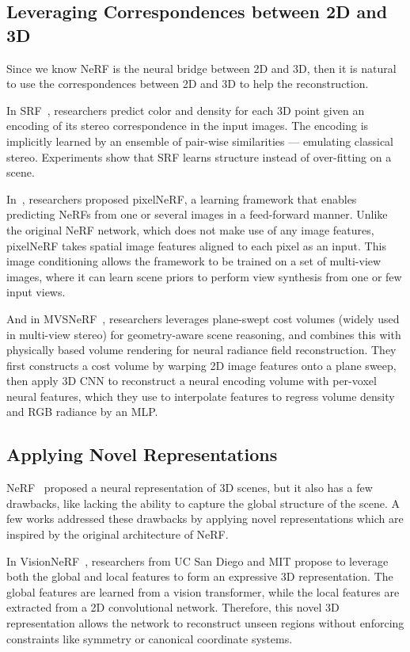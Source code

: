 \documentclass[10pt,twocolumn,letterpaper]{article}
\begin{document}
\subsection{Leveraging Correspondences between 2D and 3D}

Since we know NeRF is the neural bridge between 2D and 3D, then it is natural to use the correspondences between 2D and 3D to help the reconstruction.

In SRF~\cite{SRF}, researchers predict color and density for each 3D point given an encoding of its stereo correspondence in the input images. The encoding is implicitly learned by an ensemble of pair-wise similarities — emulating classical stereo. Experiments show that SRF learns structure instead of over-fitting on a scene.

In~\cite{yu2020pixelnerf}, researchers proposed pixelNeRF, a learning framework that enables predicting NeRFs from one or several images in a feed-forward manner. Unlike the original NeRF network, which does not make use of any image features, pixelNeRF takes spatial image features aligned to each pixel as an input. This image conditioning allows the framework to be trained on a set of multi-view images, where it can learn scene priors to perform view synthesis from one or few input views.

And in MVSNeRF~\cite{mvsnerf}, researchers leverages plane-swept cost volumes (widely used in multi-view stereo) for geometry-aware scene reasoning, and combines this with physically based volume rendering for neural radiance field reconstruction.
They first constructs a cost volume by warping 2D image features onto a plane sweep, then apply 3D CNN to reconstruct a neural encoding volume with per-voxel neural features, which they use to interpolate features to regress volume density and RGB radiance by an MLP.

\subsection{Applying Novel Representations}

NeRF~\cite{mildenhall2020nerf} proposed a neural representation of 3D scenes, but it also has a few drawbacks, like lacking the ability to capture the global structure of the scene. A few works addressed these drawbacks by applying novel representations which are inspired by the original architecture of NeRF.

In VisionNeRF~\cite{lin2023visionnerf}, researchers from UC San Diego and MIT propose to leverage both the global and local features to form an expressive 3D representation. The global features are learned from a vision transformer, while the local features are extracted from a 2D convolutional network. 
Therefore, this novel 3D representation allows the network to reconstruct unseen regions without enforcing constraints like symmetry or canonical coordinate systems.
\end{document}
